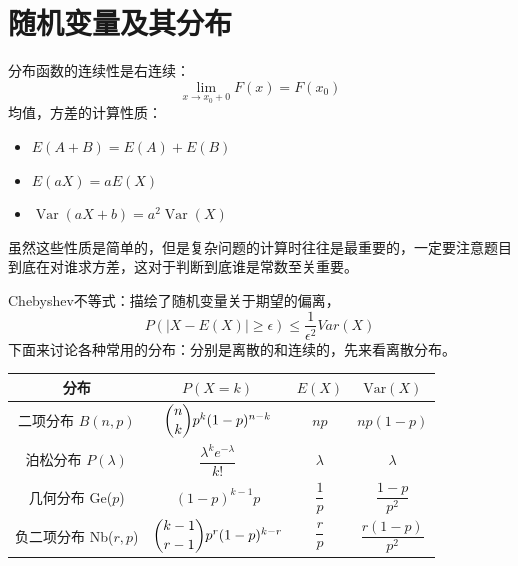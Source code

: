 \documentclass[a4paper]{ctexart}
\begin{document}
\section{随机变量及其分布}

分布函数的连续性是右连续：
\begin{equation}
    \lim_{x\to x_0+0} F(x)=F(x_0)
\end{equation}
均值，方差的计算性质：
\begin{itemize}
    \item $E(A+B) = E(A) + E(B)$
    \item $E(aX) = aE(X)$
    \item $\operatorname{Var}(aX+b) = a^2 \operatorname{Var}(X)$
\end{itemize}
\begin{tipbox}  
    虽然这些性质是简单的，但是复杂问题的计算时往往是最重要的，一定要注意题目到底在对谁求方差，这对于判断到底谁是常数至关重要。
\end{tipbox}
Chebyshev不等式：描绘了随机变量关于期望的偏离，
\begin{equation}
    P(|X-E(X)|\geq \epsilon) \leq \dfrac{1}{\epsilon^2} Var(X) 
\end{equation}
下面来讨论各种常用的分布：分别是离散的和连续的，先来看离散分布。

\vspace{6pt}
    \begin{center}
        \begin{tabular}{|c|c|c|c|}
        \hline
        分布 & $P(X=k)$ & $E(X)$ & $\mathrm{Var}(X)$ \\
        \hline
        二项分布 $B(n,p)$ & $\dbinom{n}{k}p^k(1-p)^{n-k}$ & $np$ & $np(1-p)$ \\
        \hline
        泊松分布 $P(\lambda)$ & $\dfrac{\lambda^k e^{-\lambda}}{k!}$ & $\lambda$ & $\lambda$ \\
        \hline
        几何分布 Ge($p$) & $(1-p)^{k-1}p$ & $\dfrac{1}{p}$ & $\dfrac{1-p}{p^2}$ \\
        \hline
        负二项分布 Nb($r,p$)& $\dbinom{k-1}{r-1}p^r(1-p)^{k-r}$ & $\dfrac{r}{p}$ & $\dfrac{r(1-p)}{p^2}$ \\
        \hline
        \end{tabular}
        \end{center}
\end{document}

